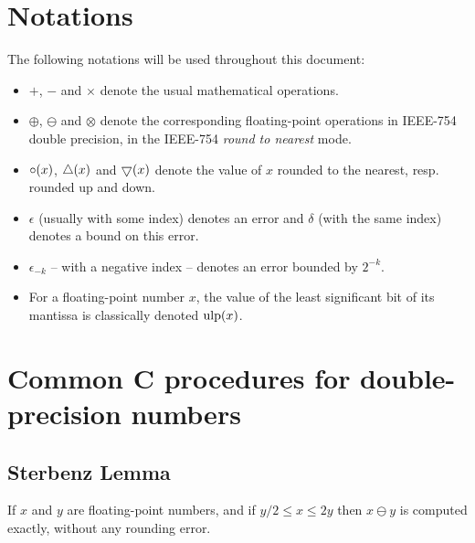 
\section{Notations\label{section:notations}}


The following notations will be used throughout this document:
\begin{itemize}

\item  $+$, $-$ and  $\times$ denote the usual
mathematical operations.

\item $\oplus$, $\ominus$ and $\otimes$ denote the
corresponding floating-point operations in IEEE-754 double precision,
in the IEEE-754 \emph{round to nearest} mode.

\item $\circ(x)$, $\bigtriangleup(x)$ and $\bigtriangledown(x)$ denote the value
  of $x$ rounded to the nearest, resp. rounded up and down.

\item $\epsilon$ (usually with some index) denotes an error and
  $\delta$ (with the same index) denotes a bound on this error.

\item $\epsilon_{-k}$ -- with a negative index -- denotes an error bounded by $2^{-k}$.
  
\item For a floating-point number $x$, the value of the least
  significant bit of its mantissa is classically denoted $\mbox{ulp}(x)$.

\end{itemize}




\section{Common C procedures  for double-precision numbers\label{section:commonCdouble}}

\subsection{Sterbenz Lemma}

\begin{theorem}
\label{sterbenz}
If $x$ and $y$ are floating-point numbers, and if ${y}/{2} \leq x \leq 2y$ then $x\ominus y$ is computed exactly, without any rounding error.
\end{theorem}


